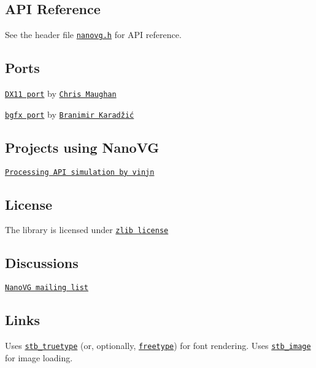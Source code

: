 \subsection*{A\+P\+I Reference}

See the header file \href{/src/nanovg.h}{\tt nanovg.\+h} for A\+P\+I reference.

\subsection*{Ports}


\begin{DoxyItemize}
\item \href{https://github.com/cmaughan/nanovg}{\tt D\+X11 port} by \href{https://github.com/cmaughan}{\tt Chris Maughan}
\item \href{https://github.com/bkaradzic/bgfx/tree/master/examples/20-nanovg}{\tt bgfx port} by \href{https://github.com/bkaradzic}{\tt Branimir Karadžić}
\end{DoxyItemize}

\subsection*{Projects using Nano\+V\+G}


\begin{DoxyItemize}
\item \href{https://github.com/vinjn/island/blob/master/examples/01-processing/sketch2d.h}{\tt Processing A\+P\+I simulation by vinjn}
\end{DoxyItemize}

\subsection*{License}

The library is licensed under \href{LICENSE.txt}{\tt zlib license}

\subsection*{Discussions}

\href{https://groups.google.com/forum/#!forum/nanovg}{\tt Nano\+V\+G mailing list}

\subsection*{Links}

Uses \href{http://nothings.org}{\tt stb\+\_\+truetype} (or, optionally, \href{http://freetype.org}{\tt freetype}) for font rendering. Uses \href{http://nothings.org}{\tt stb\+\_\+image} for image loading. 